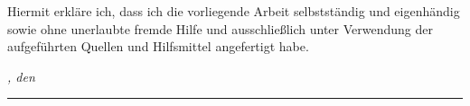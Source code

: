%
\label{sec:declaration}
\thispagestyle{empty}

Hiermit erkläre ich, dass ich die vorliegende Arbeit selbstständig und eigenhändig sowie ohne
unerlaubte fremde Hilfe und ausschließlich unter Verwendung der aufgeführten Quellen und
Hilfsmittel angefertigt habe.

\bigskip

\noindent\textit{\thesisUniversityCity, den \thesisDateGerman}

\smallskip

\begin{flushright}
	\begin{minipage}{5cm}
		\rule{\textwidth}{1pt}
		\centering\thesisName
	\end{minipage}
\end{flushright}

